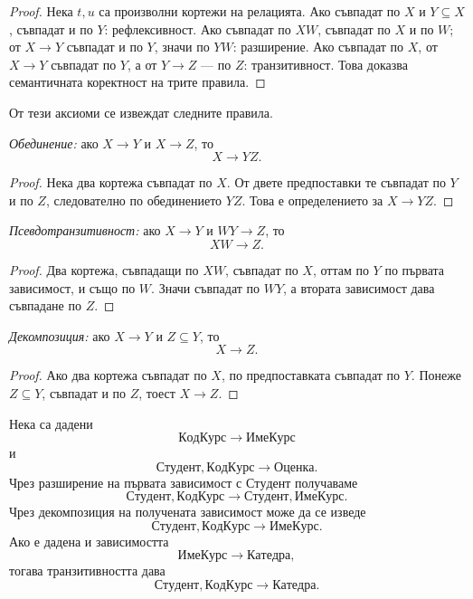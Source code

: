 \begin{proof}
Нека $t,u$ са произволни кортежи на релацията. Ако съвпадат по $X$ и $Y\subseteq X$, съвпадат и по $Y$: рефлексивност. Ако съвпадат по $XW$, съвпадат по $X$ и по $W$; от $X\to Y$ съвпадат и по $Y$, значи по $YW$: разширение. Ако съвпадат по $X$, от $X\to Y$ съвпадат по $Y$, а от $Y\to Z$ --- по $Z$: транзитивност. Това доказва семантичната коректност на трите правила.
\end{proof}

От тези аксиоми се извеждат следните правила.

\begin{prop}
\emph{Обединение:} ако $X\to Y$ и $X\to Z$, то
\[
X\to YZ.
\]
\end{prop}

\begin{proof}
Нека два кортежа съвпадат по $X$. От двете предпоставки те съвпадат по $Y$ и по $Z$, следователно по обединението $YZ$. Това е определението за $X\to YZ$.
\end{proof}

\begin{prop}
\emph{Псевдотранзитивност:} ако $X\to Y$ и $WY\to Z$, то
\[
XW\to Z.
\]
\end{prop}

\begin{proof}
Два кортежа, съвпадащи по $XW$, съвпадат по $X$, оттам по $Y$ по първата зависимост, и също по $W$. Значи съвпадат по $WY$, а втората зависимост дава съвпадане по $Z$.
\end{proof}

\begin{prop}
\emph{Декомпозиция:} ако $X\to Y$ и $Z\subseteq Y$, то
\[
X\to Z.
\]
\end{prop}

\begin{proof}
Ако два кортежа съвпадат по $X$, по предпоставката съвпадат по $Y$. Понеже $Z\subseteq Y$, съвпадат и по $Z$, тоест $X\to Z$.
\end{proof}

\begin{example}
Нека са дадени
\[
\mathrm{КодКурс}\to\mathrm{ИмеКурс}
\]
и
\[
\mathrm{Студент},\mathrm{КодКурс}\to\mathrm{Оценка}.
\]
Чрез разширение на първата зависимост с $\mathrm{Студент}$ получаваме
\[
\mathrm{Студент},\mathrm{КодКурс}
\to
\mathrm{Студент},\mathrm{ИмеКурс}.
\]
Чрез декомпозиция на получената зависимост може да се изведе
\[
\mathrm{Студент},\mathrm{КодКурс}\to\mathrm{ИмеКурс}.
\]
Ако е дадена и зависимостта
\[
\mathrm{ИмеКурс}\to\mathrm{Катедра},
\]
тогава транзитивността дава
\[
\mathrm{Студент},\mathrm{КодКурс}\to\mathrm{Катедра}.
\]
\end{example}

